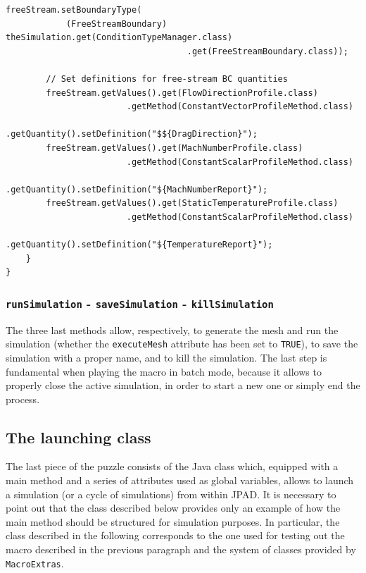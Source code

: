 \begin{lstlisting}[caption={\lstinline!createBoundaryConditions! method}, captionpos=b, tabsize=2, label={lst:CreateBoundaryConditions}]
		freeStream.setBoundaryType(
			(FreeStreamBoundary) theSimulation.get(ConditionTypeManager.class)
									.get(FreeStreamBoundary.class));
		
		// Set definitions for free-stream BC quantities
		freeStream.getValues().get(FlowDirectionProfile.class)
						.getMethod(ConstantVectorProfileMethod.class)
						.getQuantity().setDefinition("$${DragDirection}");
		freeStream.getValues().get(MachNumberProfile.class)
						.getMethod(ConstantScalarProfileMethod.class)
						.getQuantity().setDefinition("${MachNumberReport}");
		freeStream.getValues().get(StaticTemperatureProfile.class)
						.getMethod(ConstantScalarProfileMethod.class)
						.getQuantity().setDefinition("${TemperatureReport}");
	}
}
\end{lstlisting}

\subsubsection{\texttt{runSimulation} - \texttt{saveSimulation} - \texttt{killSimulation}}

The three last methods allow, respectively, to generate the mesh and run the simulation (whether the \lstinline[language=Java]!executeMesh! attribute has been set to \lstinline[language=Java]!TRUE!), to save the simulation with a proper name, and to kill the simulation. The last step is fundamental when playing the macro in batch mode, because it allows to properly close the active simulation, in order to start a new one or simply end the process.

\subsection{The launching class}
\label{sec4.4.2}

The last piece of the puzzle consists of the Java class which, equipped with a main method and a series of attributes used as global variables, allows to launch a simulation (or a cycle of simulations) from within \gls{JPAD}. It is necessary to point out that the class described below provides only an example of how the main method should be structured for simulation purposes. In particular, the class described in the following corresponds to the one used for testing out the macro described in the previous paragraph and the system of classes provided by \lstinline[language=Java]!MacroExtras!. 

